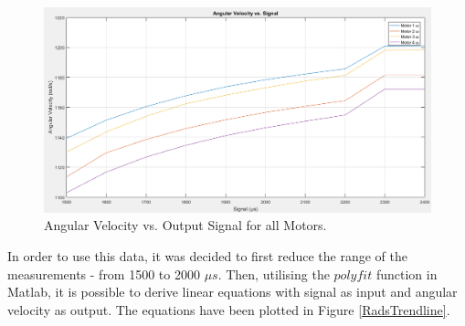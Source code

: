 \begin{figure}[H]
  \centering
    \includegraphics[width=1\textwidth]{images/radsPlots.png}
	\caption{Angular Velocity vs. Output Signal for all Motors.}
	\label{radsPlots}
\end{figure}

In order to use this data, it was decided to first reduce the range of the measurements - from 1500 to 2000 $\mu s$. Then, utilising the $polyfit$ function in Matlab, it is possible to derive linear equations with signal as input and angular velocity as output. The equations have been plotted in Figure \ref{RadsTrendline}.

